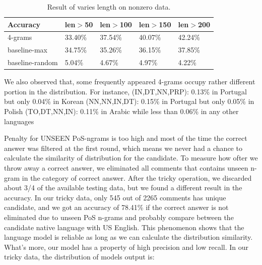 \documentclass[11pt]{article}
\begin{document}
\begin{table}[h]
\begin{center}
\small\addtolength{\tabcolsep}{-5pt}
\begin{tabular}{|l|l|l|l|l|}
\hline Accuracy & \bf len$>$50 & \bf len$>$100 & \bf len$>$150 & \bf len$>$200 \\ \hline
4-grams & 33.40\% & 37.54\%  & 40.07\% & 42.24\% \\
baseline-max  & 34.75\% & 35.26\% & 36.15\% & 37.85\% \\
baseline-random  & 5.04\% & 4.67\% & 4.97\% & 4.22\% \\
\hline
\end{tabular}
\end{center}
\caption{\label{font-table} Result of varies length on nonzero data. }
\end{table}

We also observed that, some frequently appeared 4-grams occupy rather different portion in the distribution. For instance,
(IN,DT,NN,PRP): 0.13\% in Portugal but only 0.04\% in Korean
(NN,NN,IN,DT): 0.15\% in Portugal but only 0.05\% in Polish
(TO,DT,NN,IN): 0.11\% in Arabic while less than 0.06\% in any other languages

Penalty for UNSEEN PoS-ngrams is too high and most of the time the correct answer was filtered at the first round, which means we never had a chance to calculate the similarity of distribution for the candidate. To measure how ofter we throw away a correct answer, we eliminated all comments that contains unseen n-gram in the category of correct answer. After the tricky operation, we discarded about 3/4 of the available testing data, but we found a different result in the accuracy. In our tricky data, only 545 out of 2265 comments has unique candidate, and we got an accuracy of 78.41\% if the correct answer is not eliminated due to unseen PoS n-grams and probably compare between the candidate native language with US English. This phenomenon shows that the language model is reliable as long as we can calculate the distribution similarity. What's more, our model has a property of high precision and low recall. In our tricky data, the distribution of models output is:  
\end{document}
